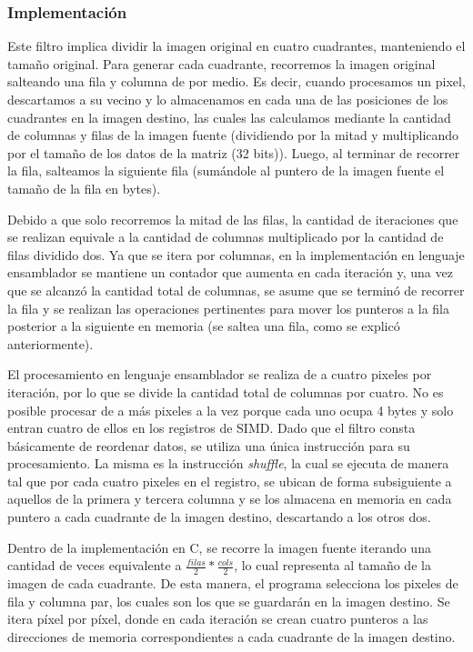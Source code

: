 \documentclass[a4paper]{article}
\begin{document}
\subsubsection{Implementación}
Este filtro implica dividir la imagen original en cuatro cuadrantes, manteniendo el tamaño original. Para generar cada cuadrante, recorremos la imagen original salteando una fila y columna de por medio. Es decir, cuando procesamos un pixel, descartamos a su vecino y lo almacenamos en cada una de las posiciones de los cuadrantes en la imagen destino, las cuales las calculamos mediante la cantidad de columnas y filas de la imagen fuente (dividiendo por la mitad y multiplicando por el tamaño de los datos de la matriz (32 bits)). Luego, al terminar de recorrer la fila, salteamos la siguiente fila (sumándole al puntero de la imagen fuente el tamaño de la fila en bytes).

Debido a que solo recorremos la mitad de las filas, la cantidad de iteraciones que se realizan equivale a la cantidad de columnas multiplicado por la cantidad de filas dividido dos. Ya que se itera por columnas, en la implementación en lenguaje ensamblador se mantiene un contador que aumenta en cada iteración y, una vez que se alcanzó la cantidad total de columnas, se asume que se terminó de recorrer la fila y se realizan las operaciones pertinentes para mover los punteros a la fila posterior a la siguiente en memoria (se saltea una fila, como se explicó anteriormente).
\bigskip

El procesamiento en lenguaje ensamblador se realiza de a cuatro pixeles por iteración, por lo que se divide la cantidad total de columnas por cuatro. No es posible procesar de a más pixeles a la vez porque cada uno ocupa 4 bytes y solo entran cuatro de ellos en los registros de SIMD. Dado que el filtro consta básicamente de reordenar datos, se utiliza una única instrucción para su procesamiento. La misma es la instrucción \textit{shuffle}, la cual se ejecuta de manera tal que por cada cuatro pixeles en el registro, se ubican de forma subsiguiente a aquellos de la primera y tercera columna y se los almacena en memoria en cada puntero a cada cuadrante de la imagen destino, descartando a los otros dos.
\bigskip

Dentro de la implementación en C, se recorre la imagen fuente iterando una cantidad de veces equivalente a $\frac{filas}{2} * \frac{cols}{2}$, lo cual representa al tamaño de la imagen de cada cuadrante. De esta manera, el programa selecciona los pixeles de fila y columna par, los cuales son los que se guardarán en la imagen destino. Se itera píxel por píxel, donde en cada iteración se crean cuatro punteros a las direcciones de memoria correspondientes a cada cuadrante de la imagen destino.
\end{document}
